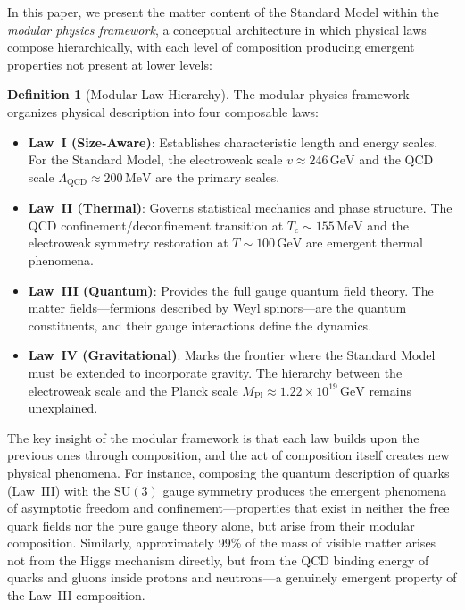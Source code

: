 \documentclass[12pt]{article}
\theoremstyle{definition}
\newtheorem{definition}[theorem]{Definition}
\theoremstyle{remark}
\newcommand{\GeV}{\,\mathrm{GeV}}
\newcommand{\MeV}{\,\mathrm{MeV}}
\begin{document}
In this paper, we present the matter content of the Standard Model within the \emph{modular physics framework}, a conceptual architecture in which physical laws compose hierarchically, with each level of composition producing emergent properties not present at lower levels:

\begin{definition}[Modular Law Hierarchy]
\label{def:modularhierarchy}
The modular physics framework organizes physical description into four composable laws:
\begin{itemize}
    \item \textbf{Law~I (Size-Aware)}: Establishes characteristic length and energy scales. For the Standard Model, the electroweak scale $v \approx 246\GeV$ and the QCD scale $\Lambda_{\mathrm{QCD}} \approx 200\MeV$ are the primary scales.
    \item \textbf{Law~II (Thermal)}: Governs statistical mechanics and phase structure. The QCD confinement/deconfinement transition at $T_c \sim 155\MeV$ and the electroweak symmetry restoration at $T \sim 100\GeV$ are emergent thermal phenomena.
    \item \textbf{Law~III (Quantum)}: Provides the full gauge quantum field theory. The matter fields---fermions described by Weyl spinors---are the quantum constituents, and their gauge interactions define the dynamics.
    \item \textbf{Law~IV (Gravitational)}: Marks the frontier where the Standard Model must be extended to incorporate gravity. The hierarchy between the electroweak scale and the Planck scale $M_{\mathrm{Pl}} \approx 1.22 \times 10^{19}\GeV$ remains unexplained.
\end{itemize}
\end{definition}

The key insight of the modular framework is that each law builds upon the previous ones through composition, and the act of composition itself creates new physical phenomena. For instance, composing the quantum description of quarks (Law~III) with the $\mathrm{SU}(3)$ gauge symmetry produces the emergent phenomena of asymptotic freedom and confinement---properties that exist in neither the free quark fields nor the pure gauge theory alone, but arise from their modular composition. Similarly, approximately 99\% of the mass of visible matter arises not from the Higgs mechanism directly, but from the QCD binding energy of quarks and gluons inside protons and neutrons---a genuinely emergent property of the Law~III composition.
\end{document}
